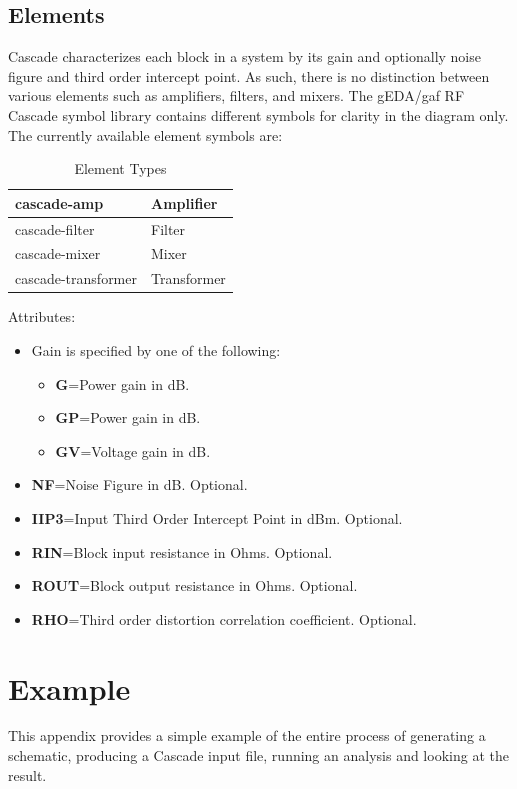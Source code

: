 \documentclass{article}
\begin{document}
\subsection{Elements}
Cascade characterizes each block in a system by its gain and optionally
noise figure and third order intercept point.  As such, there is
no distinction between various elements such as amplifiers, filters, and
mixers.  The gEDA/gaf RF Cascade symbol library contains different
symbols for clarity in the diagram only.  The currently available
element symbols are:
\begin{table}[h]
\begin{center}
\begin{tabular}{||l|l||} \hline \hline
cascade-amp           & Amplifier    \\ \hline 
cascade-filter        & Filter       \\ \hline 
cascade-mixer         & Mixer        \\ \hline 
cascade-transformer   & Transformer  \\ \hline 
\hline
\end{tabular}
\caption{Element Types}
\label{tab:elements}
\end{center}
\end{table}
Attributes:
\begin{itemize}
\item Gain is specified by one of the following:
  \begin {itemize}
  \item {\bf G}=Power gain in dB.
  \item {\bf GP}=Power gain in dB.
  \item {\bf GV}=Voltage gain in dB.
  \end {itemize}
\item {\bf NF}=Noise Figure in dB.  Optional.
\item {\bf IIP3}=Input Third Order Intercept Point in dBm.  Optional.
\item {\bf RIN}=Block input resistance in Ohms.  Optional.
\item {\bf ROUT}=Block output resistance in Ohms.  Optional.
\item {\bf RHO}=Third order distortion correlation coefficient.  Optional.
\end{itemize}
\section{Example}
This appendix provides a simple example of the entire process of
generating a schematic, producing a Cascade input file,
running an analysis and looking at the result.
\end{document}
